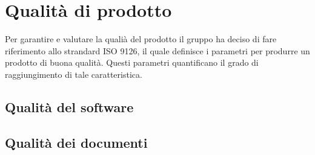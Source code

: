 \section{Qualità di prodotto}
	Per garantire e valutare la qualià del prodotto il gruppo ha deciso di fare riferimento allo strandard ISO 9126, il quale definisce i parametri per produrre un prodotto di buona qualità. Questi parametri quantificano il grado di raggiungimento di tale caratteristica.
	\subsection{Qualità del software}
		
		
		
		
		
	\subsection{Qualità dei documenti}
		
